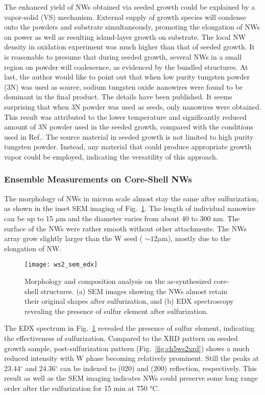 The enhanced yield of NWs obtained via seeded growth could be explained by a vapor-solid (VS) mechanism. External supply of growth species will condense onto the powders and substrate simultaneously, promoting the elongation of NWs on power as well as resulting island-layer growth on substrate. The local NW density in oxidation experiment was much higher than that of seeded growth. It is reasonable to presume that during seeded growth, several NWs in a small region on powder will coalescence, as evidenced by the bundled structures. At last, the author would like to point out that when low purity tungsten powder (3N) was used as source, sodium tungsten oxide nanowires were found to be dominant in the final product. The details have been published.\cite{Sheng2014} It seems surprising that when 3N powder was used as seeds, only  nanowires were obtained. This result was attributed to the lower temperature and significantly reduced amount of 3N powder used in the seeded growth, compared with the conditions used in Ref.\cite{Sheng2014}. The source material in seeded growth is not limited to high purity tungsten powder. Instead, any material that could produce appropriate growth vapor could be employed, indicating the versatility of this approach.
\subsubsection{Ensemble Measurements on Core-Shell NWs}

The morphology of  NWs in micron scale almost stay the same after sulfurization, as shown in the inset SEM imaging of Fig.~\ref{fig:ch5ws2sem}. The length of individual nanowire can be up to 15 $\mu$m and the diameter varies from about 40 to 300 nm. The surface of the NWs were rather smooth without other attachments. The NWs array grow slightly larger than the W seed ( $\sim 12 \mu$m), mostly due to the elongation of NW. 

\begin{figure}[htb]
\centering
\texttt{[image: ws2\_sem\_edx]}
\caption[Morphology and composition analysis on - NWs]{Morphology and composition analysis on the as-synthesized core-shell structures. (a) SEM images showing the NWs almost retain their original shapes after sulfurization, and (b) EDX spectroscopy revealing the presence of sulfur element after sulfurization.}
\label{fig:ch5ws2sem}
\end{figure}

The EDX spectrum in Fig.~\ref{fig:ch5ws2sem} revealed the presence of sulfur element, indicating the effectiveness of sulfurization. Compared to the XRD pattern on seeded growth  sample, post-sulfurization pattern (Fig.~\ref{fig:ch5ws2xrd}) shows a much reduced  intensity with W phase becoming relatively prominent. Still the peaks at 23.44$^{\circ}$ and 24.36$^{\circ}$ can be indexed to  (020) and (200) reflection, respectively. This result as well as the SEM imaging indicates  NWs could preserve some long range order after the sulfurization for 15 min at 750 \si{\degreeCelsius}. 

